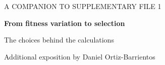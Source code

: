 \documentclass[11pt,a4paper]{article}
\begin{document}
\thispagestyle{firstpage}
{\small\color{inkblue}A COMPANION TO SUPPLEMENTARY FILE 1\par}
\vspace{5pt}
{\LARGE\bfseries From fitness variation to selection\par}
\vspace{5pt}
{\large The choices behind the calculations\par}
\vspace{7pt}
Additional exposition by Daniel Ortiz-Barrientos\par
\vspace{5pt}


{\small}
\end{document}
